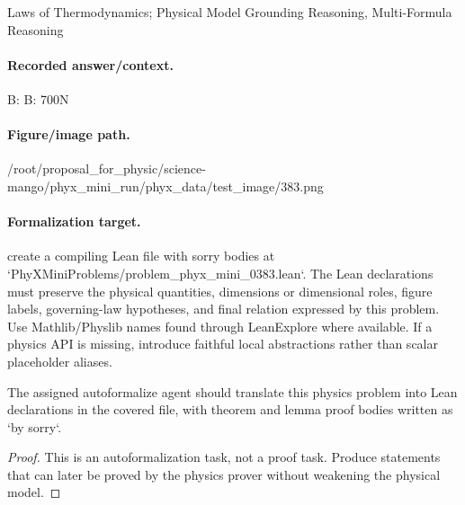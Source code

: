 Laws of Thermodynamics; Physical Model Grounding Reasoning, Multi-Formula Reasoning

\paragraph{Recorded answer/context.}
B: B: 700N

\paragraph{Figure/image path.}
/root/proposal\_for\_physic/science-mango/phyx\_mini\_run/phyx\_data/test\_image/383.png

\paragraph{Formalization target.}
create a compiling Lean file with sorry bodies at `PhyXMiniProblems/problem\_phyx\_mini\_0383.lean`. The Lean declarations must preserve the physical quantities, dimensions or dimensional roles, figure labels, governing-law hypotheses, and final relation expressed by this problem.
Use Mathlib/Physlib names found through LeanExplore where available. If a physics API is missing, introduce faithful local abstractions rather than scalar placeholder aliases.

\begin{theorem}
\label{thm:physics:phyx_mini_0383:target}
The assigned autoformalize agent should translate this physics problem into Lean declarations in the covered file, with theorem and lemma proof bodies written as `by sorry`.
\end{theorem}
\begin{proof}
This is an autoformalization task, not a proof task. Produce statements that can later be proved by the physics prover without weakening the physical model.
\end{proof}

